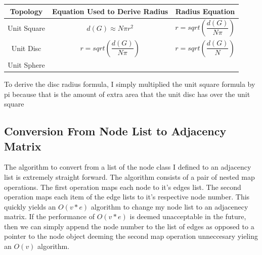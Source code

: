 \documentclass{article}
\begin{document}
		\begin{tabular}{ |c|c|c| }
				\hline
				Topology & Equation Used to Derive Radius & Radius Equation \\
				\hline
				Unit Square & $d(G) \approx N\pi r^2 $ & $r = sqrt(\dfrac{d(G)}{N\pi})$ \\
				\hline
				Unit Disc & $r = sqrt(\dfrac{d(G)}{N\pi})$ & $r = sqrt(\dfrac{d(G)}{N})$ \\
				\hline
				Unit Sphere & & \\
				\hline
		\end{tabular}

		To derive the disc radius formula, I simply multiplied the unit square formula by pi because that is the amount of extra area that the unit disc has over the unit square

		\subsection{Conversion From Node List to Adjacency Matrix}
		The algorithm to convert from a list of the node class I defined to an adjacency list is extremely straight forward.
		The algorithm consists of a pair of nested map operations.
		The first operation maps each node to it's edges list.
		The second operation maps each item of the edge lists to it's respective node number.
		This quickly yields an $O(v*e)$ algorithm to change my node list to an adjacenecy matrix.
		If the performance of $O(v*e)$ is deemed unacceptable in the future, then we can simply append the node number to the list of edges as opposed to a pointer to the node object deeming the second map operation unneccesary yieling an $O(v)$ algorithm.
\end{document}
